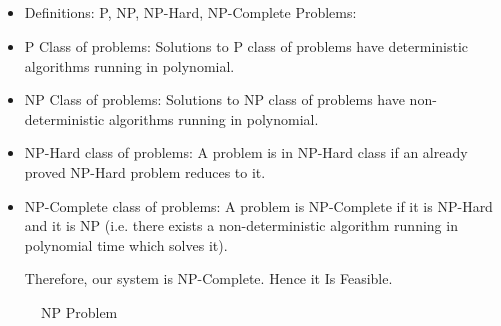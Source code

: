 \documentclass[oneside,a4paper,12pt]{report}
\begin{document}
{\begin{appendices}
\chapter{}
\begin{itemize}

\item Definitions: P, NP, NP-Hard, NP-Complete Problems:

\item P Class of problems: Solutions to P class of problems have  deterministic algorithms running  in polynomial.
\item NP Class of problems: Solutions to NP class of problems have non-deterministic algorithms running in polynomial.
\item NP-Hard class of problems: A problem is in NP-Hard class if an already proved NP-Hard problem reduces to it.
\item NP-Complete class of problems: A problem is NP-Complete if it is NP-Hard and it is NP  (i.e. there exists a non-deterministic algorithm running in polynomial time which solves it).

Therefore, our system is NP-Complete. Hence it Is Feasible.

\end{itemize}

\begin{center}
	\begin{figure}[!htbp]
		\centering
   	    \caption{NP Problem}
	    \label{fig:NP Problem}
	\end{figure}
\end{center}

\begin{itemize}





\end{itemize}
\end{appendices}}
\end{document}
